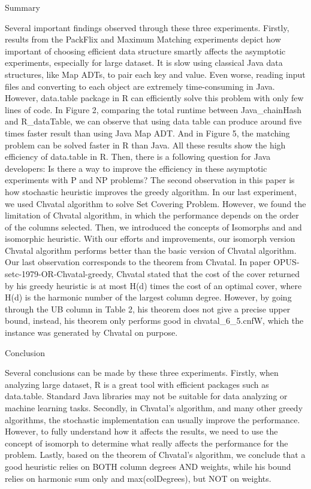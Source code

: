 Summary

Several important findings observed through these three experiments. Firstly, results from the PackFlix and Maximum Matching experiments depict how important of choosing efficient data structure smartly affects the asymptotic experiments, especially for large dataset. It is slow using classical Java data structures, like Map ADTs, to pair each key and value. Even worse, reading input files and converting to each object are extremely time-consuming in Java. However, data.table package in R can efficiently solve this problem with only few lines of code. In Figure 2, comparing the total runtime between Java_chainHash and R_dataTable, we can observe that using data table can produce around five times faster result than using Java Map ADT. And in Figure 5, the matching problem can be solved faster in R than Java. All these results show the high efficiency of data.table in R. Then, there is a following question for Java developers: Is there a way to improve the efficiency in these asymptotic experiments with P and NP problems? The second observation in this paper is how stochastic heuristic improves the greedy algorithm. In our last experiment, we used Chvatal algorithm to solve Set Covering Problem. However, we found the limitation of Chvatal algorithm, in which the performance depends on the order of the columns selected. Then, we introduced the concepts of Isomorphs and and isomorphic heuristic. With our efforts and improvements, our isomorph version Chvatal algorithm performs better than the basic version of Chvatal algorithm. Our last observation corresponds to the theorem from Chvatal. In paper OPUS-setc-1979-OR-Chvatal-greedy, Chvatal stated that the cost of the cover returned by his greedy heuristic is at most H(d) times the cost of an optimal cover, where H(d) is the harmonic number of the largest column degree. However, by going through the UB column in Table 2, his theorem does not give a precise upper bound, instead, his theorem only performs good in chvatal_6_5.cnfW, which the instance was generated by Chvatal on purpose.

Conclusion

Several conclusions can be made by these three experiments. Firstly, when analyzing large dataset, R is a great tool with efficient packages such as data.table. Standard Java libraries may not be suitable for data analyzing or machine learning tasks. Secondly, in Chvatal’s algorithm, and many other greedy algorithms, the stochastic implementation can usually improve the performance. However, to fully understand how it affects the results, we need to use the concept of isomorph to determine what really affects the performance for the problem. Lastly, based on the theorem of Chvatal’s algorithm, we conclude that a good heuristic relies on BOTH column degrees AND weights, while his bound relies on harmonic sum only and max(colDegrees), but NOT on weights. 
